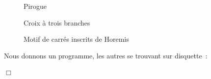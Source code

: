 \begin{figure}[!h]
%
\caption{Pirogue}%
\end{figure}
\vfil
\begin{figure}[!h]
%
\caption{Croix à trois branches}%
\label{fig:crx3b}%
\end{figure}
\onecolumn
\begin{figure}[h]
 \caption{Motif de carrés inscrits de Horemis}\label{fig:carinspt}
\end{figure}
\begin{corrige}{
Nous donnons un programme, les autres se trouvant sur disquette~:

\noindent $\Box$}\end{corrige}

\vfill

